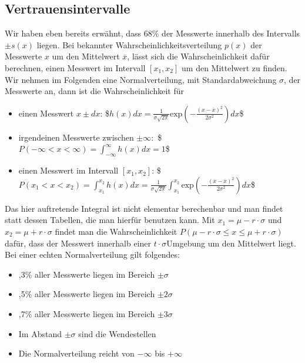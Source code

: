 \documentclass[letterpaper,10pt,english]{jupyterBook}
\begin{document}
\subsection{Vertrauensintervalle}
\label{\detokenize{content/1_Mittelwert_StdAbw:vertrauensintervalle}}
\sphinxAtStartPar
Wir haben eben bereits erwähnt, dass 68\% der Messwerte innerhalb des Intervalls \(\pm s(x)\) liegen. Bei bekannter  Wahrscheinlichkeitsverteilung \(p(x)\) der Messwerte \(x\) um den Mittelwert \(\overline x\), lässt sich die Wahrscheinlichkeit dafür berechnen, einen Messwert im Intervall \([x_1, x_2]\) um den Mittelwert zu finden. Wir nehmen im Folgenden eine Normalverteilung, mit Standardabweichung \(\sigma\), der Messwerte an, dann ist die Wahrscheinlichkeit für
\begin{itemize}
\item {} 
\sphinxAtStartPar
einen Messwert \(x\pm dx\): \$\(h(x)dx = \frac{1}{\sigma \sqrt{2\pi}}\mathrm{exp}\left(-\frac{(x-\overline x)^2}{2\sigma^2}\right) dx\)\$

\item {} 
\sphinxAtStartPar
irgendeinen Messwerte zwischen \(\pm \infty:\) \$\(P(-\infty < x < \infty) = \int_{-\infty}^\infty h(x)dx = 1\)\$

\item {} 
\sphinxAtStartPar
einen Messwert im Intervall \([x_1, x_2]\): \$\(P(x_1 < x < x_2) = \int_{x_1}^{x_2} h(x)dx =  \frac{1}{\sigma \sqrt{2\pi}}\int_{x_1}^{x_2} \mathrm{exp}\left(-\frac{(x-\overline x)^2}{2\sigma^2}\right) dx\)\$

\end{itemize}

\sphinxAtStartPar
Das hier auftretende Integral ist nicht elementar berechenbar und man findet statt dessen Tabellen, die man hierfür benutzen kann. Mit \(x_1 = \mu - r\cdot \sigma\) und \(x_2 = \mu + r\cdot \sigma\) findet man die Wahrscheinlichkeit \(P(\mu-r\cdot\sigma \leq x \leq \mu+r\cdot\sigma)\) dafür, dass der Messwert innerhalb einer \(t\cdot\sigma\)\sphinxhyphen{}Umgebung um den Mittelwert liegt.
Bei einer echten Normalverteilung gilt folgendes:
\begin{itemize}
\item {} 
,3\% aller Messwerte liegen im Bereich \(\pm \sigma\)

\item {} 
,5\% aller Messwerte liegen im Bereich \(\pm 2\sigma\)

\item {} 
,7\% aller Messwerte liegen im Bereich \(\pm 3\sigma\)

\item {} 
\sphinxAtStartPar
Im Abstand \(\pm \sigma\) sind die Wendestellen

\item {} 
\sphinxAtStartPar
Die Normalverteilung reicht von \(-\infty\) bis \(+\infty\)

\end{itemize}
\end{document}
